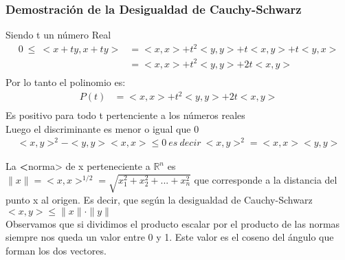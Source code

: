 \documentclass[11pt]{article}
\newcommand{\R}{\mathbb{R}}
\theoremstyle{plain}
\begin{document}
            \subsubsection{Demostración de la Desigualdad de Cauchy-Schwarz} %
            \label{subsub:demostración_de_la_desigualdad_de_cauchy_schwarz}
                Siendo t un número Real
                \begin{equation}
                    \begin{aligned}
                            0 \ \le \ <x+ty, x +ty> & = <x,x> + t^2 <y,y> + t<x,y> + t<y,x>\\
                           & = <x,x> + t^2<y,y> + 2t<x,y>\\
                    \end{aligned}
                \end{equation}
                Por lo tanto el polinomio es:
                \begin{equation}
                    \begin{aligned}
                            P(t) & = <x,x> + t^2<y,y> + 2t<x,y>\\
                    \end{aligned}
                \end{equation}
                Es positivo para todo t pertenciente a los números reales\\
                Luego el discriminante es menor o igual que 0
                \begin{equation}
                    \begin{aligned}
                            <x,y>^2 - <y,y> <x,x> \le 0 \  es\ decir\ <x,y>^2 = <x,x><y,y>
                    \end{aligned}
                \end{equation}

            La \textbf<norma> de x perteneciente a $\R ^n$ es $\|x\| = <x,x> ^{1/2} = \sqrt{x_1^2+x_2^2+...+x_n^2}$  que corresponde a la distancia del punto x al origen.
            Es decir, que según la desigualdad de Cauchy-Schwarz $<x,y> \le \|x\| \cdot \|y\|$ \\

            Observamos que si dividimos el producto escalar por el producto de las normas siempre nos queda un valor entre 0 y 1. Este valor es el coseno del ángulo que forman los dos vectores.
\end{document}
